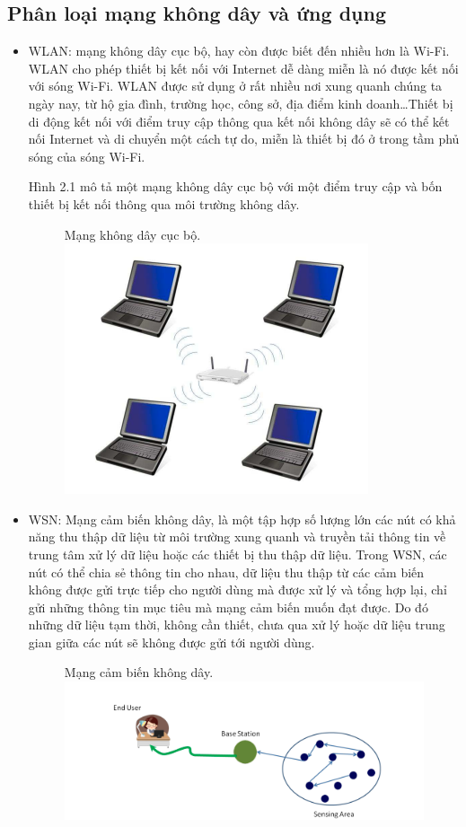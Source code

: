 \documentclass{uetgraduation}
\begin{document}
\subsection{Phân loại mạng không dây và ứng dụng}
\begin{itemize}
    \item WLAN: mạng không dây cục bộ, hay còn được biết đến nhiều hơn là Wi-Fi. WLAN cho phép thiết bị kết nối với Internet dễ dàng miễn là nó được kết nối với
    sóng Wi-Fi. WLAN được sử dụng ở rất nhiều nơi xung quanh chúng ta ngày nay, từ hộ gia đình, trường học, công sở, địa điểm kinh doanh\dots Thiết bị di động
    kết nối với điểm truy cập thông qua kết nối không dây sẽ có thể kết nối Internet và di chuyển một cách tự do, miễn là thiết bị đó ở trong tầm phủ sóng của
    sóng Wi-Fi.

    Hình 2.1 mô tả một mạng không dây cục bộ với một điểm truy cập và bốn thiết bị kết nối thông qua môi trường không dây.
    \begin{figure}{Mạng không dây cục bộ.}
        \centering
        \includegraphics[scale=0.6]{wlan}
        \label{fig:wlan}
    \end{figure}
    \item WSN: Mạng cảm biến không dây, là một tập hợp số lượng lớn các nút có khả năng thu thập dữ liệu từ môi trường xung quanh và truyền tải thông tin
    về trung tâm xử lý dữ liệu hoặc các thiết bị thu thập dữ liệu. Trong WSN, các nút có thể chia sẻ thông tin cho nhau, dữ liệu thu thập từ các cảm biến không được
    gửi trực tiếp cho người dùng mà được xử lý và tổng hợp lại, chỉ gửi những thông tin mục tiêu mà mạng cảm biến muốn đạt được. Do đó những dữ liệu tạm thời, không
    cần thiết, chưa qua xử lý hoặc dữ liệu trung gian giữa các nút sẽ không được gửi tới người dùng.
    \begin{figure}{Mạng cảm biến không dây.}
        \centering
        \includegraphics[scale=0.6]{wsn}
        \label{fig:wsn}
    \end{figure}


\end{itemize}
\end{document}
